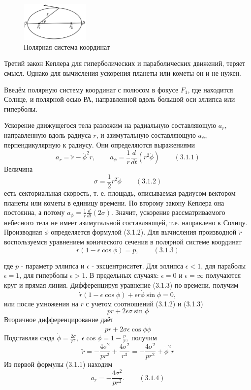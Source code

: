 \documentclass[a4paper,12pt]{article}
\begin{document}
\begin{figure}
    \begin{center}
        \includegraphics[width=0.3\textwidth]{polar.jpg}
	\caption{Полярная система координат}
    \end{center}
\end{figure}

Третий закон Кеплера для гиперболических и параболических движений, теряет смысл.
Однако для вычисления ускорения планеты или кометы он и не нужен.

Введём полярную систему координат с полюсом в фокусе $F_1$, где находится Солнце, и полярной осью РА, направленной вдоль большой оси эллипса или гиперболы.

Ускорение движущегося тела разложим на радиальную составляющую $a_r$, направленную вдоль радиуса $r$, и азимутальную составляющую $a_\phi$, перпендикулярную к радиусу.
Они определяются выражениями
$$ a_r = \ddot{r} - \dot{\phi}^2 r, \hspace{25pt} a_\phi = \frac{1}{r} \frac{d}{dt} (r^2 \dot{\phi}) \hspace{25pt} (3.1.1) $$
Величина 
$$ \sigma = \frac{1}{2} r^2 \dot{\phi} \hspace{25pt} (3.1.2) $$
есть секториальная скорость, т. е. площадь, описываемая радиусом-вектором планеты или 
кометы в единицу времени.
По второму закону Кеплера она постоянна, а потому $a_\phi = \frac{1}{r} \frac{d}{dt} (2\sigma)$.
Значит, ускорение рассматриваемого небесного тела не имеет азимутальной составляющей, т.е. направлено к Солнцу.
Производная $\dot{\phi}$ определяется формулой (3.1.2).
Для вычисления производной $\ddot{r}$ воспользуемся уравнением конического сечения в полярной системе координат
$$ r(1 - \epsilon \cos\phi) = p, \hspace{25pt} (3.1.3) $$

где $p$ - параметр эллипса и $\epsilon$ - эксцентриситет. Для эллипса $\epsilon < 1$, для параболы $\epsilon = 1$, для гиперболы $\epsilon > 1$.
В предельных случаях: $\epsilon = 0$ и $\epsilon = \infty$ получаются круг и прямая линия. 
Дифференцируя уравнение (3.1.3) по времени, получим
$$ \dot{r}(1 - \epsilon \cos\phi) + \epsilon r \dot{\phi} \sin\phi = 0, $$
или после умножения на $r$ с учетом соотношений (3.1.2) и (3.1.3) 
$$ p \dot{r} + 2 \epsilon \sigma \sin\phi $$
Вторичное дифференцирование даёт
$$ p \ddot{r} + 2 \sigma \epsilon \cos\phi \dot{\phi} $$
Подставляя сюда  $\dot{\phi} = \frac{2 \sigma}{r^2}, $  $\epsilon \cos\phi = 1 - \frac{p}{r}, $ получим
$$ \ddot{r} = -\frac{4\sigma^2}{pr^2} + \frac{4\sigma^2}{r^3} = -\frac{4\sigma^2}{pr^2} + \dot{\phi}^2 r $$
Из первой формулы (3.1.1) находим 
$$ a_r = -\frac{4\sigma^2}{pr^2}. \hspace{25pt} (3.1.4)$$
\end{document}
